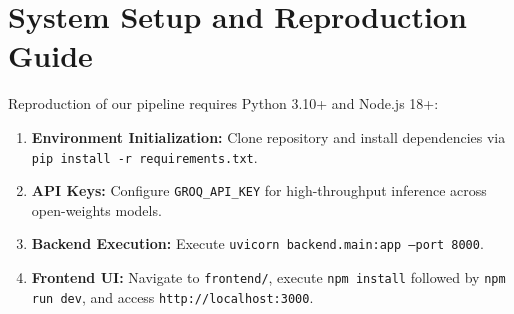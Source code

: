 \section{System Setup and Reproduction Guide}
Reproduction of our pipeline requires Python 3.10+ and Node.js 18+:
\begin{enumerate}
    \item \textbf{Environment Initialization:} Clone repository and install dependencies via \texttt{pip install -r requirements.txt}.
    \item \textbf{API Keys:} Configure \texttt{GROQ\_API\_KEY} for high-throughput inference across open-weights models.
    \item \textbf{Backend Execution:} Execute \texttt{uvicorn backend.main:app --port 8000}.
    \item \textbf{Frontend UI:} Navigate to \texttt{frontend/}, execute \texttt{npm install} followed by \texttt{npm run dev}, and access \texttt{http://localhost:3000}.
\end{enumerate}
